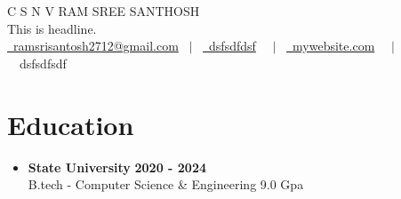 \documentclass[letterpaper,5pt]{article}
\begin{document}
    

    
    \begin{center}
        {\Huge \scshape C S N V RAM SREE SANTHOSH} \\ \vspace{1pt}
        \large This is headline. \\ \vspace{1pt}
        \href{mailto:ramsrisantosh2712@gmail.com}{\raisebox{-0.05\height}\faEnvelope \ ramsrisantosh2712@gmail.com} 
        \ $|$ \ \href{tel:dsfsdfdsf}{\raisebox{-0.05\height}\faMobile \ dsfsdfdsf}  \
        \ $|$ \ \href{mywebsite.com}{\raisebox{-0.05\height}\faGlobe \ mywebsite.com}  \
        \ $|$ \ {\raisebox{-0.05\height}\faMapMarker \ dsfsdfsdf} \ \  
        \vspace{-8pt}
    \end{center}
    
   \section{\textbf{Education}}
    
      
          \begin{itemize}[leftmargin=0in, label={}]
          \item
            \textbf{State University} \hfill \textbf{2020 - 2024} \\
            B.tech - Computer Science & Engineering \hfill 9.0 Gpa
          \end{itemize}
        
    
    

    
    \vspace*{-4mm}
\end{document}
